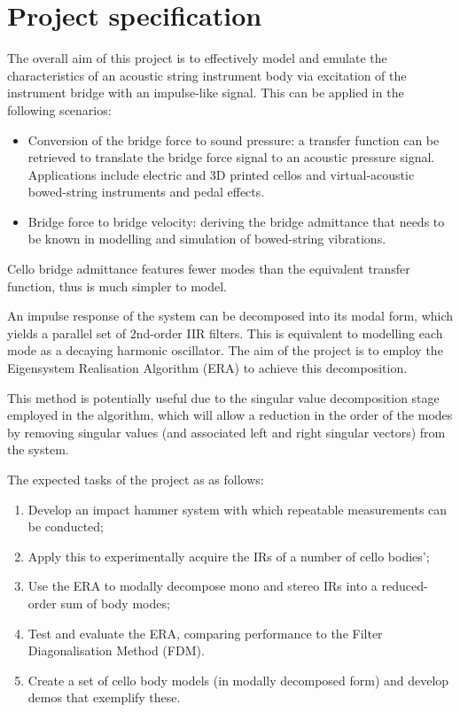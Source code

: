 \section{Project specification}
\label{sec:proj-spec}
The overall aim of this project is to effectively model and emulate the characteristics of an acoustic string instrument body via excitation of the instrument bridge with an impulse-like signal. This can be applied in the following scenarios:

\begin{itemize}
\item Conversion of the bridge force to sound pressure: a transfer function can be retrieved to translate the bridge force signal to an acoustic pressure signal. Applications include electric and 3D printed cellos and virtual-acoustic bowed-string instruments and pedal effects.
\item Bridge force to bridge velocity: deriving the bridge admittance that needs to be known in modelling and simulation of bowed-string vibrations.
\end{itemize}

 Cello bridge admittance features fewer modes than the equivalent transfer function, thus is much simpler to model.


 An impulse response of the system can be decomposed into its modal form, which yields a parallel set of 2nd-order IIR filters. This is equivalent to modelling each mode as a decaying harmonic oscillator. The aim of the project is to employ the Eigensystem Realisation Algorithm (ERA) to achieve this decomposition.

 This method is potentially useful due to the singular value decomposition stage employed in the algorithm, which will allow a reduction in the order of the modes by removing singular values (and associated left and right singular vectors) from the system.

 The expected tasks of the project as as follows:

 \begin{enumerate}
    \item Develop an impact hammer system with which repeatable measurements can be conducted;
    \item Apply this to experimentally acquire the IRs of a number of cello bodies';
    \item Use the ERA to modally decompose mono and stereo IRs into a reduced-order sum of body modes;
    \item Test and evaluate the ERA, comparing performance to the Filter Diagonalisation Method (FDM).
    \item Create a set of cello body models (in modally decomposed form) and develop demos that exemplify these.
 \end{enumerate}


